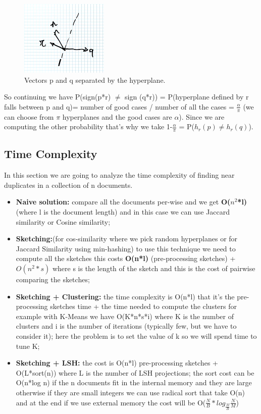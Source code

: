 \begin{figure}
    \centering
    \includegraphics[width=0.75\linewidth]{images/proofpp.png}
    \caption{Vectors p and q separated by the hyperplane.}
    \label{fig:proofpp}
\end{figure}
So continuing we have P(sign(p*r) $\neq$ sign (q*r)) = P(hyperplane defined by r falls between p and q)= number of good cases / number of all the cases = $\frac{\alpha}{\pi}$ (we can choose from $\pi$ hyperplanes and the good cases are $\alpha$). Since we are computing the other probability that's why we take 1-$\frac{\alpha}{\pi}$ = P($h_r(p) \neq h_r(q)$).
\subsection{Time Complexity}
In this section we are going to analyze the time complexity of finding near duplicates in a collection of n documents.
\begin{itemize}
    \item \textbf{Naive solution:} compare all the documents per-wise and we get \textbf{O($n^2$*l)} (where l is the document length) and in this case we can use Jaccard similarity or Cosine similarity;
    \item \textbf{Sketching:}(for cos-similarity where we pick random hyperplanes or for Jaccard Similarity using min-hashing) to use this technique we need to compute all the sketches this costs \textbf{O(n*l)} (pre-processing sketches) + $O(n^2*s)$ where s is the length of the sketch and this is the cost of pairwise comparing the sketches;
    \item \textbf{Sketching + Clustering:} the time complexity is O(n*l) that it's the pre-processing sketches time + the time needed to compute the clusters for example with K-Means we have O(K*n*s*i) where K is the number of clusters and i is the number of iterations (typically few, but we have to consider it); here the problem is to set the value of k so we will spend time to tune K;
    \item \textbf{Sketching + LSH:} the cost is O(n*l) pre-processing sketches + O(L*sort(n)) where L is the number of LSH projections; the sort cost can be O(n*log n) if the n documents fit in the internal memory and they are large otherwise if they are small integers we can use radical sort that take O(n) and at the end if we use external memory the cost will be O($\frac{N}{B}*log_{\frac{M}{B}}\frac{N}{M}$)
\end{itemize}

